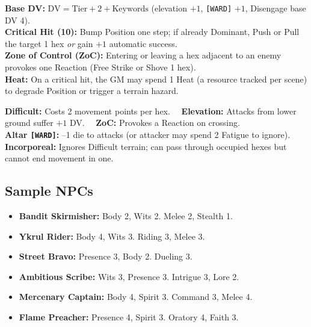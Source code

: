 \begin{tcolorbox}[title=Miniatures Mode — Speed Defaults, colback=white!98!gray, colframe=black!80!gray]
\textbf{Base DV:} $\mathrm{DV}=\mathrm{Tier}+2+\text{Keywords}$ (elevation \(+1\), \texttt{[WARD]} \(+1\), Disengage base DV 4).\\
\textbf{Critical Hit (10):} Bump Position one step; if already Dominant, Push or Pull the target 1 hex \emph{or} gain \(+1\) automatic success.\\
\textbf{Zone of Control (ZoC):} Entering or leaving a hex adjacent to an enemy provokes one Reaction (Free Strike or Shove 1 hex).\\
\textbf{Heat:} On a critical hit, the GM may spend 1 Heat (a resource tracked per scene) to degrade Position or trigger a terrain hazard.
\end{tcolorbox}

\begin{tcolorbox}[title=Hex Keywords, colback=white!98!gray, colframe=black!80!gray]
\textbf{Difficult:} Costs 2 movement points per hex. 
\textbf{Elevation:} Attacks from lower ground suffer \(+1\) DV. 
\textbf{ZoC:} Provokes a Reaction on crossing.\\
\textbf{Altar \texttt{[WARD]}:} –1 die to attacks (or attacker may spend 2 Fatigue to ignore).\\
\textbf{Incorporeal:} Ignores Difficult terrain; can pass through occupied hexes but cannot end movement in one.
\end{tcolorbox}

\subsection*{Sample NPCs}
\label{sec:sample-npcs}

\begin{tcolorbox}[title=Encounters (Tier I–II), colback=white!97!gray]
\begin{itemize}
  \item \textbf{Bandit Skirmisher:} Body 2, Wits 2. Melee 2, Stealth 1.
  \item \textbf{Ykrul Rider:} Body 4, Wits 3. Riding 3, Melee 3.
  \item \textbf{Street Bravo:} Presence 3, Body 2. Dueling 3.
\end{itemize}
\end{tcolorbox}

\begin{tcolorbox}[title=Foils \& Rivals (Tier II–III), colback=white!97!gray]
\begin{itemize}
  \item \textbf{Ambitious Scribe:} Wits 3, Presence 3. Intrigue 3, Lore 2.
  \item \textbf{Mercenary Captain:} Body 4, Spirit 3. Command 3, Melee 4.
  \item \textbf{Flame Preacher:} Presence 4, Spirit 3. Oratory 4, Faith 3.
\end{itemize}
\end{tcolorbox}

